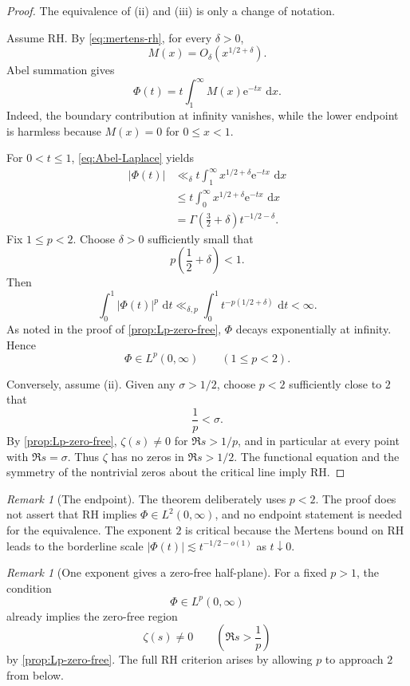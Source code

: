 \documentclass[11pt]{article}
\theoremstyle{remark}
\newtheorem{remark}[theorem]{Remark}
\newcommand{\e}{\mathrm e}
\newcommand{\dd}{\,\mathrm d}
\begin{document}
\begin{proof}
The equivalence of \textup{(ii)} and \textup{(iii)} is only a change of
notation.

Assume RH.  By \eqref{eq:mertens-rh}, for every \(\delta>0\),
\[
 M(x)=O_\delta(x^{1/2+\delta}).
\]
Abel summation gives
\begin{equation}\label{eq:Abel-Laplace}
 \Phi(t)
 =
 t\int_1^\infty M(x)\e^{-tx}\,\dd x.
\end{equation}
Indeed, the boundary contribution at infinity vanishes, while the
lower endpoint is harmless because \(M(x)=0\) for \(0\leq x<1\).

For \(0<t\leq1\), \eqref{eq:Abel-Laplace} yields
\[
 \begin{aligned}
 |\Phi(t)|
 &\ll_\delta
 t\int_1^\infty x^{1/2+\delta}\e^{-tx}\,\dd x\\
 &\leq
 t\int_0^\infty x^{1/2+\delta}\e^{-tx}\,\dd x\\
 &=
 \Gamma\!\left(\frac32+\delta\right)
 t^{-1/2-\delta}.
 \end{aligned}
\]
Fix \(1\leq p<2\).  Choose \(\delta>0\) sufficiently small that
\[
 p\left(\frac12+\delta\right)<1.
\]
Then
\[
 \int_0^1|\Phi(t)|^p\,\dd t
 \ll_{\delta,p}
 \int_0^1t^{-p(1/2+\delta)}\,\dd t
 <\infty.
\]
As noted in the proof of \cref{prop:Lp-zero-free}, \(\Phi\) decays
exponentially at infinity.  Hence
\[
 \Phi\in L^p(0,\infty)
 \qquad(1\leq p<2).
\]

Conversely, assume \textup{(ii)}.  Given any \(\sigma>1/2\), choose
\(p<2\) sufficiently close to \(2\) that
\[
 \frac1p<\sigma.
\]
By \cref{prop:Lp-zero-free}, \(\zeta(s)\neq0\) for
\(\Re s>1/p\), and in particular at every point with
\(\Re s=\sigma\).  Thus \(\zeta\) has no zeros in
\(\Re s>1/2\).  The functional equation and the symmetry of the
nontrivial zeros about the critical line imply RH.
\end{proof}

\begin{remark}[The endpoint]\label{rem:endpoint}
The theorem deliberately uses \(p<2\).  The proof does not assert that
RH implies \(\Phi\in L^2(0,\infty)\), and no endpoint statement is
needed for the equivalence.  The exponent \(2\) is critical because the
Mertens bound on RH leads to the borderline scale
\(|\Phi(t)|\lesssim t^{-1/2-o(1)}\) as \(t\downarrow0\).
\end{remark}

\begin{remark}[One exponent gives a zero-free half-plane]
For a fixed \(p>1\), the condition
\[
 \Phi\in L^p(0,\infty)
\]
already implies the zero-free region
\[
 \zeta(s)\neq0
 \qquad\left(\Re s>\frac1p\right)
\]
by \cref{prop:Lp-zero-free}.  The full RH criterion arises by allowing
\(p\) to approach \(2\) from below.
\end{remark}
\end{document}
